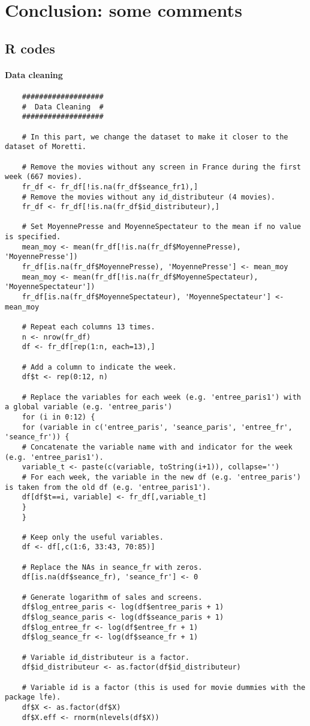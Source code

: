 \documentclass{article}
\begin{document}
\section{Conclusion: some comments}
\pagebreak
\begin{appendices}
\section{R codes}
\paragraph{Data cleaning}
\begin{lstlisting}
	###################
	#  Data Cleaning  #
	###################
	
	# In this part, we change the dataset to make it closer to the dataset of Moretti.
	
	# Remove the movies without any screen in France during the first week (667 movies).
	fr_df <- fr_df[!is.na(fr_df$seance_fr1),]
	# Remove the movies without any id_distributeur (4 movies).
	fr_df <- fr_df[!is.na(fr_df$id_distributeur),]
	
	# Set MoyennePresse and MoyenneSpectateur to the mean if no value is specified.
	mean_moy <- mean(fr_df[!is.na(fr_df$MoyennePresse), 'MoyennePresse'])
	fr_df[is.na(fr_df$MoyennePresse), 'MoyennePresse'] <- mean_moy
	mean_moy <- mean(fr_df[!is.na(fr_df$MoyenneSpectateur), 'MoyenneSpectateur'])
	fr_df[is.na(fr_df$MoyenneSpectateur), 'MoyenneSpectateur'] <- mean_moy
	
	# Repeat each columns 13 times.
	n <- nrow(fr_df)
	df <- fr_df[rep(1:n, each=13),]
	
	# Add a column to indicate the week.
	df$t <- rep(0:12, n)
	
	# Replace the variables for each week (e.g. 'entree_paris1') with a global variable (e.g. 'entree_paris')
	for (i in 0:12) {
	for (variable in c('entree_paris', 'seance_paris', 'entree_fr', 'seance_fr')) {
	# Concatenate the variable name with and indicator for the week (e.g. 'entree_paris1').
	variable_t <- paste(c(variable, toString(i+1)), collapse='')
	# For each week, the variable in the new df (e.g. 'entree_paris') is taken from the old df (e.g. 'entree_paris1').
	df[df$t==i, variable] <- fr_df[,variable_t]
	}
	}
	
	# Keep only the useful variables.
	df <- df[,c(1:6, 33:43, 70:85)]
	
	# Replace the NAs in seance_fr with zeros.
	df[is.na(df$seance_fr), 'seance_fr'] <- 0
	
	# Generate logarithm of sales and screens.
	df$log_entree_paris <- log(df$entree_paris + 1)
	df$log_seance_paris <- log(df$seance_paris + 1)
	df$log_entree_fr <- log(df$entree_fr + 1)
	df$log_seance_fr <- log(df$seance_fr + 1)
	
	# Variable id_distributeur is a factor.
	df$id_distributeur <- as.factor(df$id_distributeur)
	
	# Variable id is a factor (this is used for movie dummies with the package lfe).
	df$X <- as.factor(df$X)
	df$X.eff <- rnorm(nlevels(df$X))
	
\end{lstlisting}
\end{appendices}
\end{document}
